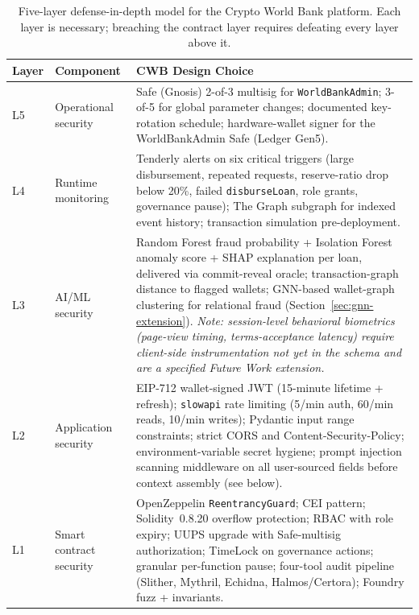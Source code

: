 \documentclass[12pt,a4paper]{report}
\newcommand{\tableheadcolor}{\rowcolor{TableHeadBg}}
\begin{document}
\begin{table}[H]
\centering
\caption[Five-layer defense-in-depth model]{Five-layer defense-in-depth model for the Crypto World Bank platform. Each layer is necessary; breaching the contract layer requires defeating every layer above it.}
\label{tab:defense-layers}
\begin{tabular}{p{1.4cm}p{4.0cm}p{8.5cm}}
\toprule
\tableheadcolor
\textbf{Layer} & \textbf{Component} & \textbf{CWB Design Choice} \\
\midrule
L5 & Operational security & Safe (Gnosis) 2-of-3 multisig for \texttt{WorldBankAdmin}; 3-of-5 for global parameter changes; documented key-rotation schedule; hardware-wallet signer for the WorldBankAdmin Safe (Ledger Gen5). \\
L4 & Runtime monitoring & Tenderly alerts on six critical triggers (large disbursement, repeated requests, reserve-ratio drop below 20\%, failed \texttt{disburseLoan}, role grants, governance pause); The Graph subgraph for indexed event history; transaction simulation pre-deployment. \\
L3 & AI/ML security & Random Forest fraud probability + Isolation Forest anomaly score + SHAP explanation per loan, delivered via commit-reveal oracle; transaction-graph distance to flagged wallets; GNN-based wallet-graph clustering for relational fraud (Section~\ref{sec:gnn-extension}). \textit{Note: session-level behavioral biometrics (page-view timing, terms-acceptance latency) require client-side instrumentation not yet in the schema and are a specified Future Work extension.} \\
L2 & Application security & EIP-712 wallet-signed JWT (15-minute lifetime + refresh); \texttt{slowapi} rate limiting (5/min auth, 60/min reads, 10/min writes); Pydantic input range constraints; strict CORS and Content-Security-Policy; environment-variable secret hygiene; prompt injection scanning middleware on all user-sourced fields before context assembly (see below). \\
L1 & Smart contract security & OpenZeppelin \texttt{ReentrancyGuard}; CEI pattern; Solidity~0.8.20 overflow protection; RBAC with role expiry; UUPS upgrade with Safe-multisig authorization; TimeLock on governance actions; granular per-function pause; four-tool audit pipeline (Slither, Mythril, Echidna, Halmos/Certora); Foundry fuzz + invariants. \\
\bottomrule
\end{tabular}
\end{table}
\end{document}
